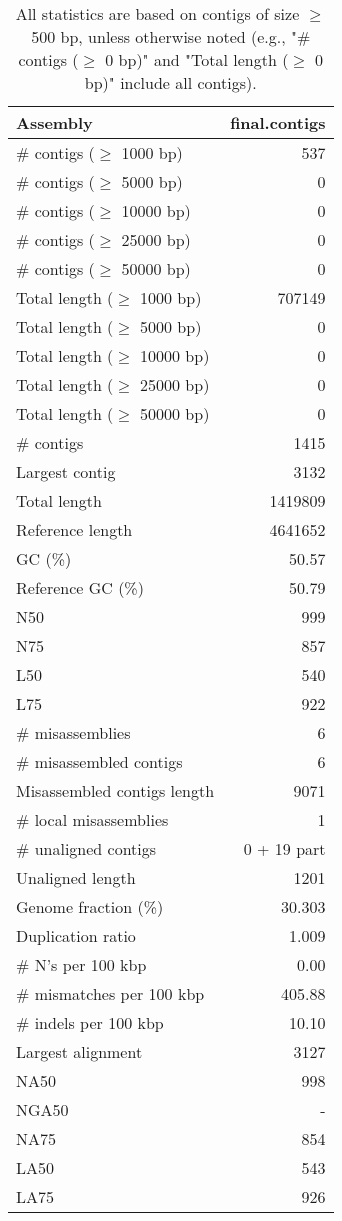 \documentclass[12pt,a4paper]{article}
\begin{document}
\begin{table}[ht]
\begin{center}
\caption{All statistics are based on contigs of size $\geq$ 500 bp, unless otherwise noted (e.g., "\# contigs ($\geq$ 0 bp)" and "Total length ($\geq$ 0 bp)" include all contigs).}
\begin{tabular}{|l*{1}{|r}|}
\hline
Assembly & final.contigs \\ \hline
\# contigs ($\geq$ 1000 bp) & 537 \\ \hline
\# contigs ($\geq$ 5000 bp) & 0 \\ \hline
\# contigs ($\geq$ 10000 bp) & 0 \\ \hline
\# contigs ($\geq$ 25000 bp) & 0 \\ \hline
\# contigs ($\geq$ 50000 bp) & 0 \\ \hline
Total length ($\geq$ 1000 bp) & 707149 \\ \hline
Total length ($\geq$ 5000 bp) & 0 \\ \hline
Total length ($\geq$ 10000 bp) & 0 \\ \hline
Total length ($\geq$ 25000 bp) & 0 \\ \hline
Total length ($\geq$ 50000 bp) & 0 \\ \hline
\# contigs & 1415 \\ \hline
Largest contig & 3132 \\ \hline
Total length & 1419809 \\ \hline
Reference length & 4641652 \\ \hline
GC (\%) & 50.57 \\ \hline
Reference GC (\%) & 50.79 \\ \hline
N50 & 999 \\ \hline
N75 & 857 \\ \hline
L50 & 540 \\ \hline
L75 & 922 \\ \hline
\# misassemblies & 6 \\ \hline
\# misassembled contigs & 6 \\ \hline
Misassembled contigs length & 9071 \\ \hline
\# local misassemblies & 1 \\ \hline
\# unaligned contigs & 0 + 19 part \\ \hline
Unaligned length & 1201 \\ \hline
Genome fraction (\%) & 30.303 \\ \hline
Duplication ratio & 1.009 \\ \hline
\# N's per 100 kbp & 0.00 \\ \hline
\# mismatches per 100 kbp & 405.88 \\ \hline
\# indels per 100 kbp & 10.10 \\ \hline
Largest alignment & 3127 \\ \hline
NA50 & 998 \\ \hline
NGA50 & - \\ \hline
NA75 & 854 \\ \hline
LA50 & 543 \\ \hline
LA75 & 926 \\ \hline
\end{tabular}
\end{center}
\end{table}
\end{document}
